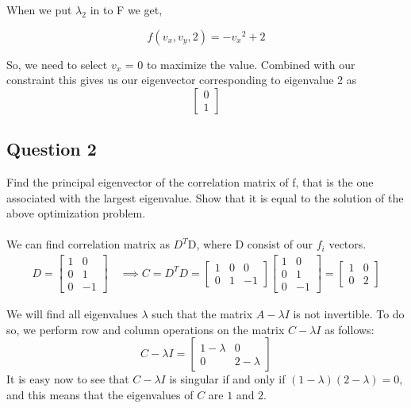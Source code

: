 \documentclass{article}
\begin{document}
When we put $\lambda_2$ in to F we get,

\begin{equation*}
f(v_x, v_y, 2) =-{v_x}^2 + 2
\end{equation*}

So, we need to select $v_x$ = 0 to maximize the value. Combined with our constraint this gives us our eigenvector corresponding to eigenvalue 2 as $$\begin{bmatrix}0\\1\end{bmatrix} $$

\subsection{Question 2}
Find the principal eigenvector of the correlation matrix of f, that is the one associated with the largest eigenvalue. Show that it is equal to the solution of the above optimization problem.\\
\\
We can find correlation matrix as $D^{T}$D, where D consist of our $f_i$ vectors.
\begin{gather*}
D = \begin{bmatrix}1&0\\0&1\\0&-1\end{bmatrix} \quad \implies C = D^T D = \begin{bmatrix}1&0&0\\0&1&-1\end{bmatrix} \begin{bmatrix}1&0\\0&1\\0&-1\end{bmatrix} =  \begin{bmatrix}1&0\\0&2\end{bmatrix}
\end{gather*}

We will find all eigenvalues $\lambda$ such that the matrix $A-\lambda I$ 
is not invertible.  To do so, we perform row and column operations 
on the matrix $C-\lambda I$ as follows:  
\[
C-\lambda I=\begin{bmatrix}1-\lambda&0\\0&2-\lambda\end{bmatrix}
\]
It is easy now to see that $C-\lambda I$ is singular if and only if $(1-\lambda)(2-\lambda)=0$, and this means that the eigenvalues of $C$ are $1$ and $2$.  
\end{document}
